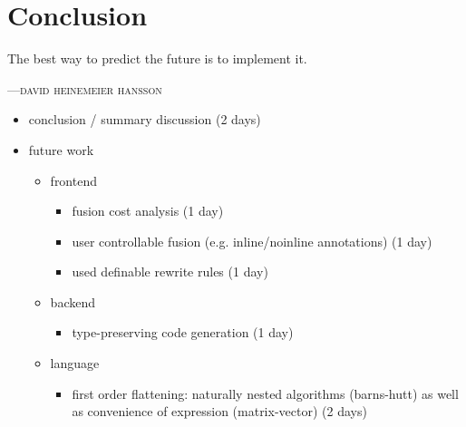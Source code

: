 %
%

\chapter{Conclusion}
\epigraph{The best way to predict the future is to implement it.}
{\textsc{---david heinemeier hansson}}

\begin{itemize}
\item conclusion / summary discussion (2 days)

\item future work
    \begin{itemize}
    \item frontend
        \begin{itemize}
            \item fusion cost analysis (1 day)
            \item user controllable fusion (e.g. inline/noinline annotations) (1 day)
            \item used definable rewrite rules (1 day)
        \end{itemize}
    \item backend
        \begin{itemize}
            \item type-preserving code generation (1 day)
        \end{itemize}
    \item language
        \begin{itemize}
            \item first order flattening: naturally nested algorithms
                (barns-hutt) as well as convenience of expression
                (matrix-vector) (2 days)
        \end{itemize}
    \end{itemize}
\end{itemize}

